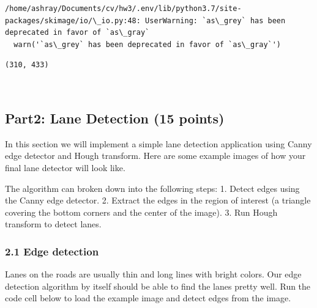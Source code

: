 \documentclass[11pt]{article}
\begin{document}
    \begin{Verbatim}[commandchars=\\\{\}]
/home/ashray/Documents/cv/hw3/.env/lib/python3.7/site-packages/skimage/io/\_io.py:48: UserWarning: `as\_grey` has been deprecated in favor of `as\_gray`
  warn('`as\_grey` has been deprecated in favor of `as\_gray`')

    \end{Verbatim}

    \begin{Verbatim}[commandchars=\\\{\}]
(310, 433)

    \end{Verbatim}

    \begin{center}
    \end{center}
    { \hspace*{\fill} \\}
    
    \hypertarget{part2-lane-detection-15-points}{%
\subsection{Part2: Lane Detection (15
points)}\label{part2-lane-detection-15-points}}

In this section we will implement a simple lane detection application
using Canny edge detector and Hough transform. Here are some example
images of how your final lane detector will look like.

The algorithm can broken down into the following steps: 1. Detect edges
using the Canny edge detector. 2. Extract the edges in the region of
interest (a triangle covering the bottom corners and the center of the
image). 3. Run Hough transform to detect lanes.

    \hypertarget{edge-detection}{%
\subsubsection{2.1 Edge detection}\label{edge-detection}}

Lanes on the roads are usually thin and long lines with bright colors.
Our edge detection algorithm by itself should be able to find the lanes
pretty well. Run the code cell below to load the example image and
detect edges from the image.
\end{document}
